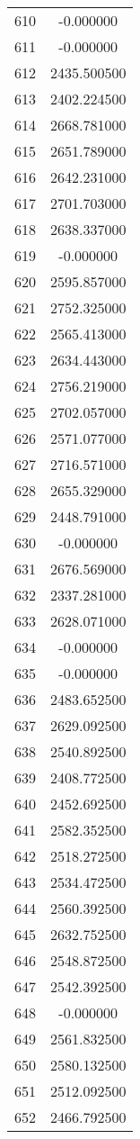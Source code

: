 \documentclass[12pt]{article}
\begin{document}
\begin{longtable}{@{}cc@{}}
610 & -0.000000 \\
611 & -0.000000 \\
612 & 2435.500500 \\
613 & 2402.224500 \\
614 & 2668.781000 \\
615 & 2651.789000 \\
616 & 2642.231000 \\
617 & 2701.703000 \\
618 & 2638.337000 \\
619 & -0.000000 \\
620 & 2595.857000 \\
621 & 2752.325000 \\
622 & 2565.413000 \\
623 & 2634.443000 \\
624 & 2756.219000 \\
625 & 2702.057000 \\
626 & 2571.077000 \\
627 & 2716.571000 \\
628 & 2655.329000 \\
629 & 2448.791000 \\
630 & -0.000000 \\
631 & 2676.569000 \\
632 & 2337.281000 \\
633 & 2628.071000 \\
634 & -0.000000 \\
635 & -0.000000 \\
636 & 2483.652500 \\
637 & 2629.092500 \\
638 & 2540.892500 \\
639 & 2408.772500 \\
640 & 2452.692500 \\
641 & 2582.352500 \\
642 & 2518.272500 \\
643 & 2534.472500 \\
644 & 2560.392500 \\
645 & 2632.752500 \\
646 & 2548.872500 \\
647 & 2542.392500 \\
648 & -0.000000 \\
649 & 2561.832500 \\
650 & 2580.132500 \\
651 & 2512.092500 \\
652 & 2466.792500 \\

\end{longtable}
\end{document}
